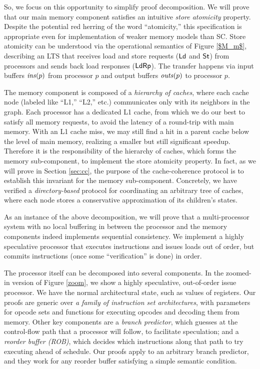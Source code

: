 So, we focus on this opportunity to simplify proof decomposition.  We will
prove that our main memory component satisfies an intuitive \emph{store
atomicity} property.  Despite the potential red herring of the word
``atomicity,'' this specification is appropriate even for implementation of
weaker memory models than SC.  Store atomicity can be understood via the
operational semantics of Figure \ref{$M_m$}, describing an LTS that receives
load and store requests ($\mathsf{Ld}$ and $\mathsf{St}$) from processors and sends back load
responses ($\mathsf{Ld}\mathsf{Rp}$). The transfer happens via input buffers $\mathit{ins}(p)$ from
processor $p$ and output buffers $\mathit{outs}(p)$ to processor $p$.

The memory component is composed of a \emph{hierarchy of caches}, where each
cache node (labeled like ``L1,'' ``L2,'' etc.) communicates only with its
neighbors in the graph.  Each processor has a dedicated L1 cache, from which we
do our best to satisfy all memory requests, to avoid the latency of a
round-trip with main memory.  With an L1 cache miss, we may still find a hit in
a parent cache below the level of main memory, realizing a smaller but still
significant speedup.  Therefore it is the responsibility of the hierarchy of
caches, which forms the memory sub-component, to implement the store atomicity
property. In fact, as we will prove in Section \ref{sec:cc}, the purpose of the
cache-coherence protocol is to establish this invariant for the memory
sub-component.  Concretely, we have verified a \emph{directory-based} protocol
for coordinating an arbitrary tree of caches, where each node stores a
conservative approximation of its children's states.

As an instance of the above decomposition, we will prove that a multi-processor system with no local buffering in between the processor and the memory components indeed implements sequential consistency. We implement a highly speculative processor that executes instructions and issues loads out of order, but commits instructions (once some ``verification'' is done) in order.

The processor itself can be decomposed into several components. In the zoomed-in version of Figure \ref{zoom}, we show a highly speculative, out-of-order issue processor. We have the normal architectural state, such as values of registers.  Our proofs are generic over \emph{a family of instruction set architectures}, with parameters for opcode sets and functions for executing opcodes and decoding them from memory.  Other key components are a \emph{branch predictor}, which guesses at the control-flow path that a processor will follow, to facilitate speculation; and a \emph{reorder buffer (ROB)}, which decides which instructions along that path to try executing ahead of schedule. Our proofs apply to an arbitrary branch predictor, and they work for any reorder buffer satisfying a simple semantic condition.


